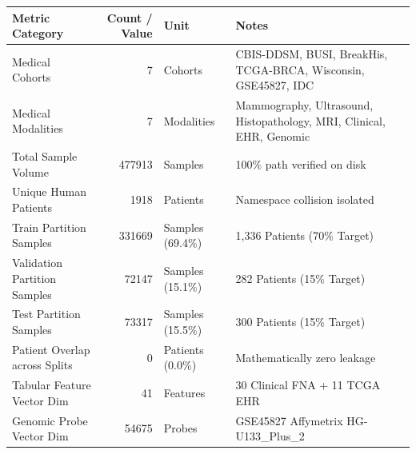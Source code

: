 \begin{tabular}{lrll}
\toprule
Metric Category & Count / Value & Unit & Notes \\
\midrule
Medical Cohorts & 7 & Cohorts & CBIS-DDSM, BUSI, BreakHis, TCGA-BRCA, Wisconsin, GSE45827, IDC \\
Medical Modalities & 7 & Modalities & Mammography, Ultrasound, Histopathology, MRI, Clinical, EHR, Genomic \\
Total Sample Volume & 477913 & Samples & 100\% path verified on disk \\
Unique Human Patients & 1918 & Patients & Namespace collision isolated \\
Train Partition Samples & 331669 & Samples (69.4\%) & 1,336 Patients (70\% Target) \\
Validation Partition Samples & 72147 & Samples (15.1\%) & 282 Patients (15\% Target) \\
Test Partition Samples & 73317 & Samples (15.5\%) & 300 Patients (15\% Target) \\
Patient Overlap across Splits & 0 & Patients (0.0\%) & Mathematically zero leakage \\
Tabular Feature Vector Dim & 41 & Features & 30 Clinical FNA + 11 TCGA EHR \\
Genomic Probe Vector Dim & 54675 & Probes & GSE45827 Affymetrix HG-U133\_Plus\_2 \\
\bottomrule
\end{tabular}
